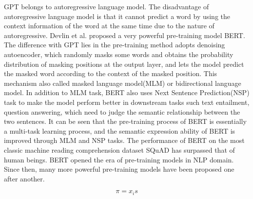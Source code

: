 \documentclass{article}
\begin{document}
GPT belongs to autoregressive language model. The disadvantage of autoregressive language model is that it cannot predict a word by using the context information 
of the word at the same time due to the nature of autoregressive. Devlin et al. proposed a very powerful pre-training model BERT. The difference with GPT lies in 
the pre-training method adopts denoising autoencoder, which randomly masks some words and obtains the probability distribution of masking positions at the output layer, 
and lets the model predict the masked word according to the context of the masked position. This mechanism also called masked language model(MLM) or bidirectional language model. 
In addition to MLM task, BERT also uses Next Sentence Prediction(NSP) task to make the model perform better in downstream tasks such text entailment, question answering, which need to judge 
the semantic relationship between the two sentences. It can be seen that the pre-training process of BERT is essentially a multi-task learning process, and the semantic expression 
ability of BERT is improved through MLM and NSP tasks. The performance of BERT on the most classic machine reading comprehension dataset SQuAD has surpassed that of human beings. 
BERT opened the era of pre-training models in NLP domain. Since then, many more powerful pre-training models have been proposed one after another. 



\begin{equation}
	\pi=x_is
\end{equation}
\end{document}
